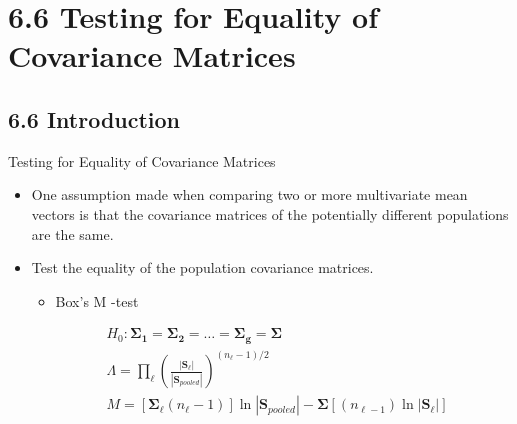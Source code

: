 \documentclass[8pt]{beamer}
\begin{document}
    


\section{6.6 Testing for Equality of Covariance Matrices}

\subsection{6.6 Introduction}
    \begin{frame}{Testing for Equality of Covariance Matrices} %
            \begin{itemize}
                \item One assumption made when comparing two or more multivariate mean vectors is that the covariance matrices of the potentially different populations are the same. 
                \item Test the equality of the population covariance matrices. 
                \begin{itemize}
                    \item Box's M -test 
                \end{itemize}
                
                \begin{align}
                    &H_{0}: \mathbf{\Sigma_{1} = \Sigma_{2} = \hdots = \Sigma_{g} = \Sigma}\\
                    &\Lambda = \prod_{\ell}\left(\frac{|\mathbf{S}_{\ell}|}{|\mathbf{S}_{pooled}|}\right)^{(n_{\ell} - 1)/2}\\
                    &M = \left[\mathbf{\Sigma}_{\ell}(n_{\ell} -1)\right] \ln{|\mathbf{S}_{pooled}|} - \mathbf{\Sigma}[(n_{\ell - 1})\ln{|\mathbf{S}_{\ell}|}]
                \end{align}
            
            \end{itemize}
    \end{frame}
    
\end{document}
